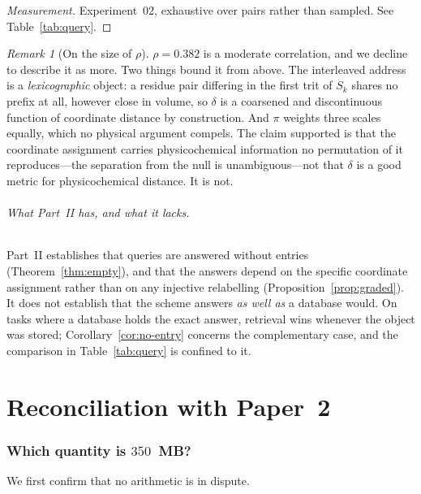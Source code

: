 \documentclass[11pt,twocolumn,a4paper]{article}
\newcommand{\Sk}{S_{k}}
\theoremstyle{plain}
\theoremstyle{definition}
\theoremstyle{remark}
\newtheorem{remark}{Remark}
\begin{document}
\begin{proof}[Measurement]
Experiment~02, exhaustive over pairs rather than sampled. See
Table~\ref{tab:query}.
\end{proof}

\begin{remark}[On the size of $\rho$]
\label{rem:rho-honest}
$\rho = 0.382$ is a moderate correlation, and we decline to describe it as
more. Two things bound it from above. The interleaved address is a
\emph{lexicographic} object: a residue pair differing in the first trit of
$\Sk$ shares no prefix at all, however close in volume, so $\delta$ is a
coarsened and discontinuous function of coordinate distance by construction.
And $\pi$ weights three scales equally, which no physical argument compels.
The claim supported is that the coordinate assignment carries
physicochemical information no permutation of it reproduces---the separation
from the null is unambiguous---not that $\delta$ is a good metric for
physicochemical distance. It is not.
\end{remark}

\paragraph{What Part~II has, and what it lacks.}
Part~II establishes that queries are answered without entries
(Theorem~\ref{thm:empty}), and that the answers depend on the specific
coordinate assignment rather than on any injective relabelling
(Proposition~\ref{prop:graded}). It does not establish that the scheme
answers \emph{as well as} a database would. On tasks where a database holds
the exact answer, retrieval wins whenever the object was stored;
Corollary~\ref{cor:no-entry} concerns the complementary case, and the
comparison in Table~\ref{tab:query} is confined to it.

\part{Reconciliation with Paper~2}
\section{Which quantity is \texorpdfstring{$350$}{350}~MB?}
\label{sec:reconcile}

We first confirm that no arithmetic is in dispute.
\end{document}
